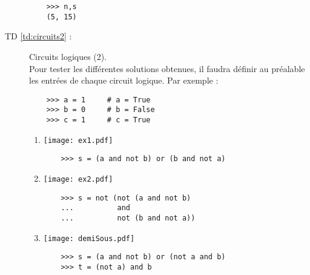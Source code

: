 \begin{description}
	\begin{py}{11cm}
	\begin{verbatim}
	>>> n,s
	(5, 15)
	\end{verbatim}
	\end{py}

\item[TD \ref{td:circuits2} :] Circuits logiques (2).\\
	Pour tester les différentes solutions obtenues, il faudra définir au préalable
	les entrées de chaque circuit logique.
	Par exemple : \ \begin{py}{8cm}
	\begin{verbatim}
	>>> a = 1     # a = True
	>>> b = 0     # b = False
	>>> c = 1     # c = True
	\end{verbatim}
	\end{py}

	\begin{enumerate}
	\item \begin{minipage}{6cm}\texttt{[image: ex1.pdf]}\end{minipage}
	\hspace*{3mm}
	\begin{py}{8cm}
	\begin{verbatim}
	>>> s = (a and not b) or (b and not a)
	\end{verbatim}
	\end{py}

	\item \begin{minipage}{6cm}\texttt{[image: ex2.pdf]}\end{minipage}
	\hspace*{3mm}
	\begin{py}{8cm}
	\begin{verbatim}
	>>> s = not (not (a and not b) 
	...          and 
	...          not (b and not a))
	\end{verbatim}
	\end{py}

	\item  \begin{minipage}{6cm}\texttt{[image: demiSous.pdf]}\end{minipage}
	\hspace*{3mm}
	\begin{py}{8cm}
	\begin{verbatim}
	>>> s = (a and not b) or (not a and b)
	>>> t = (not a) and b
	\end{verbatim}
	\end{py}


\end{enumerate}
\end{description}

